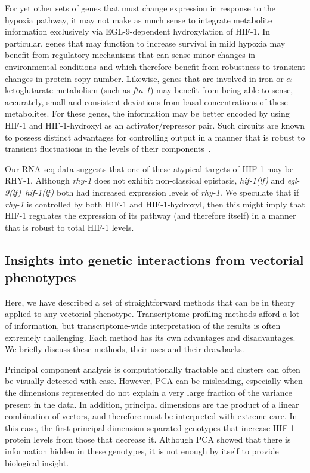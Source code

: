 \documentclass[9pt,twocolumn,twoside,lineno]{pnas-new}
\newcommand{\gene}[1]{\emph{#1}}
\newcommand{\ftna}{\emph{\mbox{ftn-1}}}
\newcommand{\eglhif}{\emph{\mbox{egl-9(lf)}~\mbox{hif-1(lf)}}}
\newcommand{\hif}{\emph{\mbox{hif-1(lf)}}}
\newcommand{\eglp}{EGL-9}
\newcommand{\rhyp}{RHY-1}
\newcommand{\hifp}{HIF-1}
\begin{document}
For yet other sets of genes that must change expression in response to the
hypoxia pathway, it may not make as much sense to integrate metabolite information
exclusively via \eglp{}-dependent hydroxylation of \hifp{}. In particular, genes
that may function to increase survival in mild hypoxia may benefit from
regulatory mechanisms that can sense minor changes in environmental conditions
and which therefore benefit from robustness to transient changes in protein copy
number. Likewise, genes that are involved in iron or $\alpha$-ketoglutarate
metabolism (such as \ftna{}) may benefit from being able to sense, accurately,
small and consistent deviations from basal concentrations of these metabolites.
For these genes, the information may be better encoded by using \hifp{} and
\hifp{}-hydroxyl as an activator/repressor pair. Such circuits are known to
possess distinct advantages for controlling output in a manner that is robust to
transient fluctuations in the levels of their components~\cite{Hart2012,Hart2013}.

Our RNA-seq data suggests that one of these atypical targets of \hifp{} may be
\rhyp{}. Although \gene{rhy-1} does not exhibit non-classical epistasis, \hif{}
and \eglhif{} both had increased expression levels of \gene{rhy-1}. We speculate
that if \gene{rhy-1} is controlled by both \hifp{} and \hifp{}-hydroxyl, then
this might imply that \hifp{} regulates the expression of its pathway (and
therefore itself) in a manner that is robust to total \hifp{} levels.

\subsection*{Insights into genetic interactions from vectorial phenotypes}
Here, we have described a set of straightforward methods that can be in theory
applied to any vectorial phenotype. Transcriptome profiling methods afford a lot
of information, but transcriptome-wide interpretation of the results is often
extremely challenging. Each method has its own advantages and disadvantages. We
briefly discuss these methods, their uses and their drawbacks.

Principal component analysis is computationally tractable and clusters can often
be visually detected with ease. However, PCA can be misleading, especially when
the dimensions represented do not explain a very large fraction of the variance
present in the data. In addition, principal dimensions are the product of a
linear combination of vectors, and therefore must be interpreted with extreme
care. In this case, the first principal dimension separated genotypes that
increase \hifp{} protein levels from those that decrease it. Although PCA showed
that there is information hidden in these genotypes, it is not enough by itself
to provide biological insight.
\end{document}
